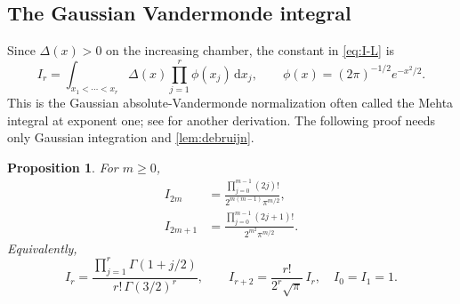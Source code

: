 \documentclass[11pt]{article}
\numberwithin{equation}{section}
\newtheorem{proposition}[proposition]{Proposition}
\theoremstyle{definition}
\newcommand{\dd}{\mathrm{d}}
\newcommand{\vander}{\Delta}
\begin{document}
\subsection{The Gaussian Vandermonde integral}
Since $\vander(x)>0$ on the increasing chamber, the constant in \eqref{eq:I-L} is
\begin{equation}\label{eq:I-integral}
 I_r=\int_{x_1<\cdots<x_r}\vander(x)
          \prod_{j=1}^r\phi(x_j)\,\dd x_j,
 \qquad \phi(x)=(2\pi)^{-1/2}e^{-x^2/2}.
\end{equation}
This is the Gaussian absolute-Vandermonde normalization often called the Mehta integral at exponent one; see \cite{Nicolaescu} for another derivation. The following proof needs only Gaussian integration and \cref{lem:debruijn}.

\begin{proposition}\label{prop:gaussian}
For $m\geq0$,
\begin{align}
 I_{2m}&=\frac{\prod_{j=0}^{m-1}(2j)!}{2^{m(m-1)}\pi^{m/2}},\label{eq:I-even}\\
 I_{2m+1}&=\frac{\prod_{j=0}^{m-1}(2j+1)!}{2^{m^2}\pi^{m/2}}.\label{eq:I-odd}
\end{align}
Equivalently,
\begin{equation}\label{eq:I-gamma}
 I_r=\frac{\prod_{j=1}^r\Gamma(1+j/2)}{r!\,\Gamma(3/2)^r},
 \qquad I_{r+2}=\frac{r!}{2^r\sqrt\pi}\,I_r,
 \quad I_0=I_1=1.
\end{equation}
\end{proposition}
\end{document}
